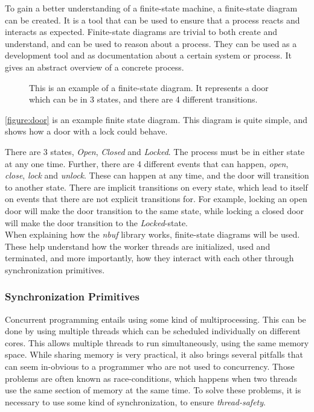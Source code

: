 \documentclass[a4paper]{article}
\newcommand{\nbuf}{\textit{nbuf} }
\begin{document}
To gain a better understanding of a finite-state machine, a finite-state diagram can be created. It is a tool that can be used to ensure that a process reacts and interacts as expected. Finite-state diagrams are trivial to both create and understand, and can be used to reason about a process. They can be used as a development tool and as documentation about a certain system or process. It gives an abstract overview of a concrete process.\\

\begin{figure}
	\begin{adjustwidth}{-0.5in}{-0.5in}
    \centering
    \def\svgwidth{\columnwidth}
    
  	\caption{This is an example of a finite-state diagram. It represents a door which can be in 3 states, and there are 4 different transitions.}
	\label{figure:door}
	\end{adjustwidth}
\end{figure}

\autoref{figure:door} is an example finite state diagram. This diagram is quite simple, and shows how a door with a lock could behave.

There are 3 states, \textit{Open}, \textit{Closed} and \textit{Locked}. The process must be in either state at any one time. Further, there are 4 different events that can happen, \textit{open}, \textit{close}, \textit{lock} and \textit{unlock}. These can happen at any time, and the door will transition to another state. There are implicit transitions on every state, which lead to itself on events that there are not explicit transitions for. For example, locking an open door will make the door transition to the same state, while locking a closed door will make the door transition to the \textit{Locked}-state.\\

When explaining how the \nbuf library works, finite-state diagrams will be used. These help understand how the worker threads are initialized, used and terminated, and more importantly, how they interact with each other through synchronization primitives.


\subsubsection{Synchronization Primitives}
Concurrent programming entails using some kind of multiprocessing. This can be done by using multiple threads which can be scheduled individually on different cores. This allows multiple threads to run simultaneously, using the same memory space. While sharing memory is very practical, it also brings several pitfalls that can seem in-obvious to a programmer who are not used to concurrency. Those problems are often known as race-conditions, which happens when two threads use the same section of memory at the same time. To solve these problems, it is necessary to use some kind of synchronization, to ensure \textit{thread-safety}.
\end{document}
